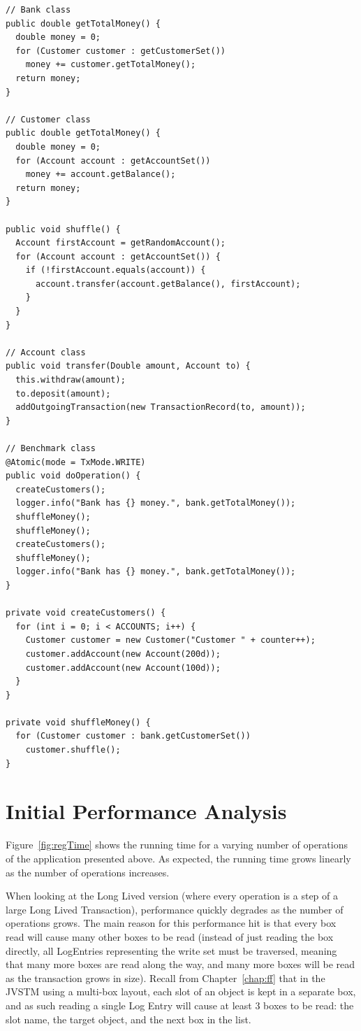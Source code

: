 \begin{lstlisting}[caption={Code for the Business Operation},
float]
// Bank class
public double getTotalMoney() {
  double money = 0;
  for (Customer customer : getCustomerSet())
    money += customer.getTotalMoney();
  return money;
}

// Customer class
public double getTotalMoney() {
  double money = 0;
  for (Account account : getAccountSet())
    money += account.getBalance();
  return money;
}

public void shuffle() {
  Account firstAccount = getRandomAccount();
  for (Account account : getAccountSet()) {
    if (!firstAccount.equals(account)) {
      account.transfer(account.getBalance(), firstAccount);
    }
  }
}

// Account class
public void transfer(Double amount, Account to) {
  this.withdraw(amount);
  to.deposit(amount);
  addOutgoingTransaction(new TransactionRecord(to, amount));
}

// Benchmark class
@Atomic(mode = TxMode.WRITE)
public void doOperation() {
  createCustomers();
  logger.info("Bank has {} money.", bank.getTotalMoney());
  shuffleMoney();
  shuffleMoney();
  createCustomers();
  shuffleMoney();
  logger.info("Bank has {} money.", bank.getTotalMoney());
}

private void createCustomers() {
  for (int i = 0; i < ACCOUNTS; i++) {
    Customer customer = new Customer("Customer " + counter++);
    customer.addAccount(new Account(200d));
    customer.addAccount(new Account(100d));
  }
}

private void shuffleMoney() {
  for (Customer customer : bank.getCustomerSet())
    customer.shuffle();
}
\end{lstlisting}


\section{Initial Performance Analysis}

Figure~\ref{fig:regTime} shows the running time for a varying number
of operations of the application presented above. As expected, the
running time grows linearly as the number of operations increases.

When looking at the Long Lived version (where every operation is a
step of a large Long Lived Transaction), performance quickly degrades
as the number of operations grows. The main reason for this
performance hit is that every box read will cause many other boxes to
be read (instead of just reading the box directly, all LogEntries
representing the write set must be traversed, meaning that many more
boxes are read along the way, and many more boxes will be read as the
transaction grows in size). Recall from Chapter~\ref{chap:ff} that in
the JVSTM using a multi-box layout, each slot of an object is kept in
a separate box, and as such reading a single Log Entry will cause at
least 3 boxes to be read: the slot name, the target object, and the
next box in the list.

